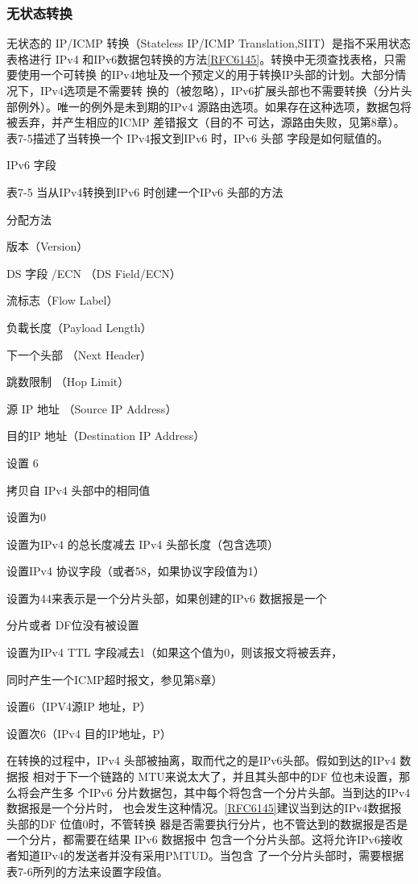 \subsubsection{无状态转换}

无状态的 IP/ICMP 转换（Stateless IP/ICMP Translation,SIIT）是指不采用状态表格进行
IPv4
和IPv6数据包转换的方法\href{https://www.rfc-editor.org/rfc/rfc6145}{[RFC6145]}。转换中无须查找表格，只需要使用一个可转换
的IPv4地址及一个预定义的用于转换IP头部的计划。大部分情况下，IPv4选项是不需要转
换的（被忽略），IPv6扩展头部也不需要转换（分片头部例外）。唯一的例外是未到期的IPv4
源路由选项。如果存在这种选项，数据包将被丢弃，并产生相应的ICMP 差错报文（目的不
可达，源路由失败，见第8章）。表7-5描述了当转换一个 IPv4报文到IPv6 时，IPv6 头部
字段是如何赋值的。

IPv6 字段

表7-5 当从IPv4转换到IPv6 时创建一个IPv6 头部的方法

分配方法

版本（Version）

DS 字段 /ECN （DS Field/ECN）

流标志（Flow Label）

负載长度（Payload Length）

下一个头部 （Next Header）

跳数限制 （Hop Limit）

源 IP 地址 （Source IP Address）

目的IP 地址（Destination IP Address）

设置 6

拷贝自 IPv4 头部中的相同值

设置为0

设置为IPv4 的总长度减去 IPv4 头部长度（包含选项）

设置IPv4 协议字段（或者58，如果协议字段值为1）

设置为44来表示是一个分片头部，如果创建的IPv6 数据报是一个

分片或者 DF位没有被设置

设置为IPv4 TTL 字段减去1（如果这个值为0，则该报文将被丢弃，

同时产生一个ICMP超时报文，参见第8章）

设置6（IPV4源IP 地址，P）

设置次6（IPv4 目的IP地址，P）

在转换的过程中，IPv4 头部被抽离，取而代之的是IPv6头部。假如到达的IPv4 数据报
相对于下一个链路的 MTU来说太大了，并且其头部中的DF 位也未设置，那么将会产生多
个IPv6 分片数据包，其中每个将包含一个分片头部。当到达的IPv4数据报是一个分片时，
也会发生这种情况。\href{https://www.rfc-editor.org/rfc/rfc6145}{[RFC6145]}建议当到达的IPv4数据报头部的DF
位值0时，不管转换
器是否需要执行分片，也不管达到的数据报是否是一个分片，都需要在结果 IPv6 数据报中
包含一个分片头部。这将允许IPv6接收者知道IPv4的发送者并没有采用PMTUD。当包含
了一个分片头部时，需要根据表7-6所列的方法来设置字段值。

